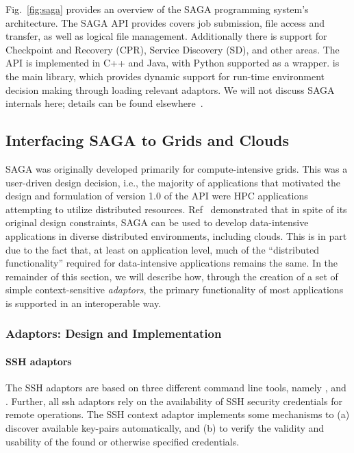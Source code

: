 \documentclass[3p,twocolumn]{elsarticle}
\begin{document}
Fig.~\ref{fig:saga} provides an overview of the SAGA programming
system's architecture.  The SAGA API provides covers job submission,
file access and transfer, as well as logical file management.
Additionally there is support for Checkpoint and Recovery (CPR), Service
Discovery (SD), and other areas.  The API is implemented in C++ and
Java, with Python supported as a wrapper.  is the main
library, which provides dynamic support for run-time environment
decision making through loading relevant adaptors. We will not discuss
SAGA internals here; details can be found
elsewhere~\cite{saga_url,Kaiser:2006qp}.

\subsection{Interfacing SAGA to Grids and Clouds}


SAGA was originally developed primarily for compute-intensive grids.
This was a user-driven design decision, i.e., the majority of
applications that motivated the design and formulation of version 1.0
of the API were HPC applications attempting to utilize distributed
resources.  Ref~\cite{saga_ccgrid09} demonstrated that in spite of its
original design constraints, SAGA can be used to develop
data-intensive applications in diverse distributed environments,
including clouds.  This is in part due to the fact that, at least on
application level, much of the ``distributed functionality'' required
for data-intensive applications remains the same.  In the remainder of
this section, we will describe how, through the creation of a set of
simple context-sensitive {\it adaptors}, the primary functionality of
most applications is supported in an interoperable way.


\subsubsection{Adaptors: Design and Implementation}


\paragraph{SSH adaptors}

The SSH adaptors are based on three different command line tools,
namely \ssh, \scp and \sshfs.  Further, all ssh adaptors rely on the
availability of SSH security credentials for remote operations.  The
SSH context adaptor implements some mechanisms to (a) discover
available key-pairs automatically, and (b) to verify the validity and
usability of the found or otherwise specified credentials.
  
\end{document}
